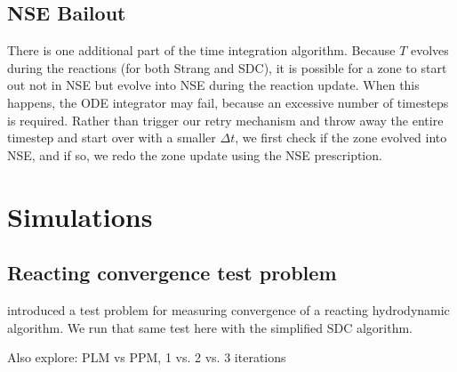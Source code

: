 \documentclass[times,modern]{aastex63}
\begin{document}
\subsection{NSE Bailout}

There is one additional part of the time integration algorithm.
Because $T$ evolves during the reactions (for both Strang and SDC), it
is possible for a zone to start out not in NSE but evolve into NSE
during the reaction update.  When this happens, the ODE integrator may
fail, because an excessive number of timesteps is required.  Rather
than trigger our retry mechanism and throw away the entire timestep
and start over with a smaller $\Delta t$, we first check if the zone
evolved into NSE, and if so, we redo the zone update using the NSE
prescription.

\section{Simulations}

\subsection{Reacting convergence test problem}

\cite{castro_sdc} introduced a test problem for measuring convergence
of a reacting hydrodynamic algorithm.  We run that same test here with the
simplified SDC algorithm.

Also explore: PLM vs PPM, 1 vs. 2 vs. 3 iterations

\end{document}

